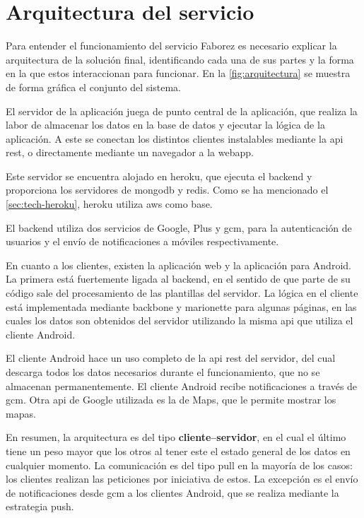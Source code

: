 \documentclass[main]{subfiles}
\begin{document}
\chapter{Arquitectura del servicio}
\label{sec:arquitectura}

Para entender el funcionamiento del servicio Faborez es necesario explicar la arquitectura de la solución final, identificando cada una de sus partes y la forma en la que estos interaccionan para funcionar. En la \cref{fig:arquitectura} se muestra de forma gráfica el conjunto del sistema.



El servidor de la aplicación juega de punto central de la aplicación, que realiza la labor de almacenar los datos en la base de datos y ejecutar la lógica de la aplicación. A este se conectan los distintos clientes instalables mediante la api \gls{rest}, o directamente mediante un navegador a la \gls{webapp}.

Este servidor se encuentra alojado en \gls{heroku}, que ejecuta el \gls{backend} y proporciona los servidores de \gls{mongodb} y \gls{redis}. Como se ha mencionado el \cref{sec:tech-heroku}, \gls{heroku} utiliza \gls{aws} como base.

El \gls{backend} utiliza dos servicios de Google, Plus y \gls{gcm}, para la autenticación de usuarios y el envío de notificaciones a móviles respectivamente.

En cuanto a los clientes, existen la aplicación web y la aplicación para Android. La primera está fuertemente ligada al \gls{backend}, en el sentido de que parte de su código sale del procesamiento de las plantillas del servidor. La lógica en el cliente está implementada mediante \gls{backbone} y \gls{marionette} para algunas páginas, en las cuales los datos son obtenidos del servidor utilizando la misma \gls{api} que utiliza el cliente Android.

El cliente Android hace un uso completo de la \gls{api} \gls{rest} del servidor, del cual descarga todos los datos necesarios durante el funcionamiento, que no se almacenan permanentemente. El cliente Android recibe notificaciones a través de \gls{gcm}. Otra \gls{api} de Google utilizada es la de Maps, que le permite mostrar los mapas.

En resumen, la arquitectura es del tipo \textbf{cliente--servidor}, en el cual el último tiene un peso mayor que los otros al tener este el estado general de los datos en cualquier momento. La comunicación es del tipo \gls{pull} en la mayoría de los casos: los clientes realizan las peticiones por iniciativa de estos. La excepción es el envío de notificaciones desde \gls{gcm} a los clientes Android, que se realiza mediante la estrategia \gls{push}.
\end{document}
